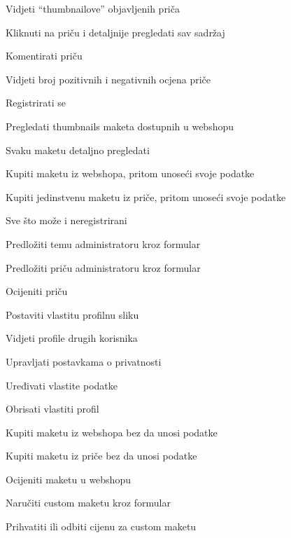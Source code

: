 			
			\begin{packed_enum}
				\item  {}
				
				\begin{packed_enum}
					
					\item Vidjeti “thumbnailove” objavljenih priča
					\item Kliknuti na priču i detaljnije pregledati sav sadržaj
					\item Komentirati priču
					\item Vidjeti broj pozitivnih i negativnih ocjena priče
					\item Registrirati se
					\item Pregledati thumbnails maketa dostupnih u webshopu
					\item Svaku maketu detaljno pregledati
					\item Kupiti maketu iz webshopa, pritom unoseći svoje podatke
					\item Kupiti jedinstvenu maketu iz priče, pritom unoseći svoje podatke
				\end{packed_enum}
			
				\item  {}
				
				\begin{packed_enum}
					
					\item Sve što može i neregistrirani
					\item Predložiti temu administratoru kroz formular
					\item Predložiti priču administratoru kroz formular
					\item Ocijeniti priču
					\item Postaviti vlastitu profilnu sliku
					\item Vidjeti profile drugih korisnika
					\item Upravljati postavkama o privatnosti
					\item Uređivati vlastite podatke
					\item Obrisati vlastiti profil
					\item Kupiti maketu iz webshopa bez da unosi podatke
					\item Kupiti maketu iz priče bez da unosi podatke
					\item Ocijeniti maketu u webshopu
					\item Naručiti custom maketu kroz formular
					\item Prihvatiti ili odbiti cijenu za custom maketu


\end{packed_enum}
\end{packed_enum}
